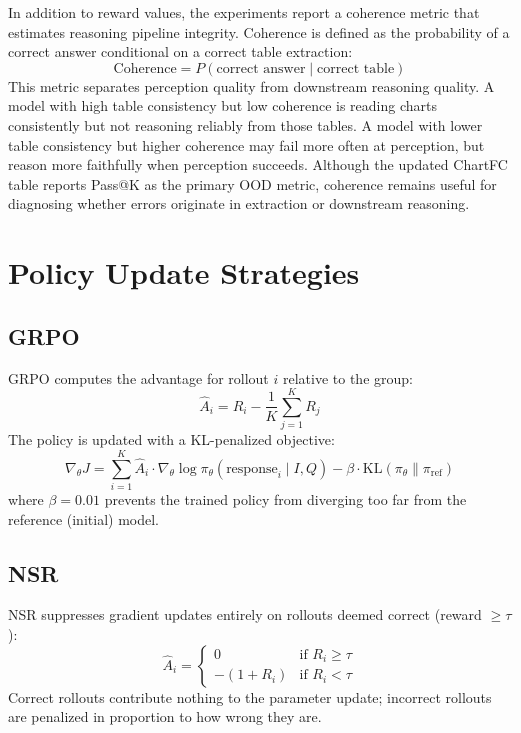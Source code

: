 \documentclass{iutbscthesis}
\begin{document}
In addition to reward values, the experiments report a coherence metric that estimates reasoning pipeline integrity. Coherence is defined as the probability of a correct answer conditional on a correct table extraction:
\begin{equation}
    \mathrm{Coherence} = P(\text{correct answer} \mid \text{correct table})
\end{equation}
This metric separates perception quality from downstream reasoning quality. A model with high table consistency but low coherence is reading charts consistently but not reasoning reliably from those tables. A model with lower table consistency but higher coherence may fail more often at perception, but reason more faithfully when perception succeeds. Although the updated ChartFC table reports Pass@K as the primary OOD metric, coherence remains useful for diagnosing whether errors originate in extraction or downstream reasoning.

\section{Policy Update Strategies}

\subsection{GRPO}

GRPO computes the advantage for rollout $i$ relative to the group:
\begin{equation}
    \hat{A}_i = R_i - \frac{1}{K} \sum_{j=1}^{K} R_j
\end{equation}
The policy is updated with a KL-penalized objective:
\begin{equation}
    \nabla_\theta J = \sum_{i=1}^{K} \hat{A}_i \cdot \nabla_\theta \log \pi_\theta(\text{response}_i \mid I, Q) - \beta \cdot \mathrm{KL}(\pi_\theta \| \pi_{\text{ref}})
\end{equation}
where $\beta = 0.01$ prevents the trained policy from diverging too far from the reference (initial) model.

\subsection{NSR}

NSR suppresses gradient updates entirely on rollouts deemed correct (reward $\geq \tau$):
\begin{equation}
    \hat{A}_i = \begin{cases} 0 & \text{if } R_i \geq \tau \\ -(1 + R_i) & \text{if } R_i < \tau \end{cases}
\end{equation}
Correct rollouts contribute nothing to the parameter update; incorrect rollouts are penalized in proportion to how wrong they are.
\end{document}
